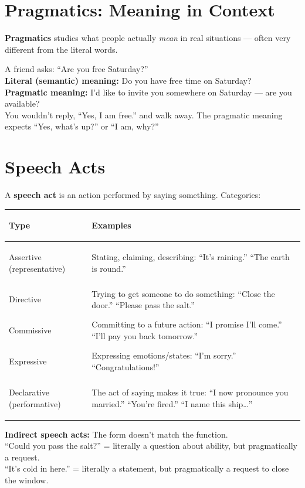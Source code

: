 \documentclass[11pt, letterpaper]{article}
\newcommand{\example}[1]{%
  \begin{tcolorbox}[colback=exbg, colframe=exborder,
    title={\bfseries Example}, arc=3pt, boxrule=1pt]
  #1
  \end{tcolorbox}%
}
\begin{document}
\section*{Pragmatics: Meaning in Context}

\textbf{Pragmatics} studies what people actually \emph{mean} in real situations --- often very different from the literal words.

\example{
A friend asks: ``Are you free Saturday?''\\
\textbf{Literal (semantic) meaning:} Do you have free time on Saturday?\\
\textbf{Pragmatic meaning:} I'd like to invite you somewhere on Saturday --- are you available?\\[4pt]
You wouldn't reply, ``Yes, I am free.'' and walk away. The pragmatic meaning expects ``Yes, what's up?'' or ``I am, why?''
}

\section*{Speech Acts}

A \textbf{speech act} is an action performed by saying something. Categories:

\noindent
{\renewcommand{\arraystretch}{1.5}
\begin{tabularx}{\textwidth}{>{\bfseries\raggedright\arraybackslash}p{3cm}
                              >{\raggedright\arraybackslash}X}
\toprule
\rowcolor{tableheadergrey}
\textbf{Type} & \textbf{Examples} \\
\midrule
\rowcolor{rowGr} Assertive (representative) & Stating, claiming, describing: ``It's raining.'' ``The earth is round.'' \\
\rowcolor{rowA}  Directive                  & Trying to get someone to do something: ``Close the door.'' ``Please pass the salt.'' \\
\rowcolor{rowGr} Commissive                 & Committing to a future action: ``I promise I'll come.'' ``I'll pay you back tomorrow.'' \\
\rowcolor{rowA}  Expressive                 & Expressing emotions/states: ``I'm sorry.'' ``Congratulations!'' \\
\rowcolor{rowGr} Declarative (performative) & The act of saying makes it true: ``I now pronounce you married.'' ``You're fired.'' ``I name this ship\ldots'' \\
\bottomrule
\end{tabularx}}

\textbf{Indirect speech acts:} The form doesn't match the function.\\
\quad ``Could you pass the salt?'' = literally a question about ability, but pragmatically a request.\\
\quad ``It's cold in here.'' = literally a statement, but pragmatically a request to close the window.
\end{document}
